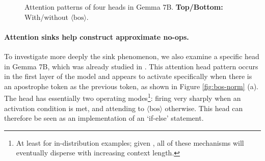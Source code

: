\documentclass{article} %
\newcommand{\bos}{\ensuremath{\langle\text{bos}\rangle}\xspace}
\begin{document}
\begin{figure}[H]
    \caption{Attention patterns of four heads in Gemma 7B. \textbf{Top/Bottom:} With/without \bos.}%
    \label{fig:head-smoothening}%
    \vspace{-10pt}
\end{figure}


\paragraph{Attention sinks help construct approximate no-ops.}To investigate more deeply the sink phenomenon, we also examine a specific head in Gemma 7B, which was already studied in \citet{barbero2025round}. This attention head pattern occurs in the first layer of the model and appears to activate specifically when there is an apostrophe token as the previous token, as shown in Figure \ref{fig:bos-norm} (a). The head has essentially two operating modes\footnote{At least for in-distribution examples; given \citet{velivckovic2024softmax}, all of these mechanisms will eventually disperse with increasing context length.}: firing very sharply when an activation condition is met, and attending to \bos otherwise. This head can therefore be seen as an implementation of an `if-else' statement. 
\end{document}
